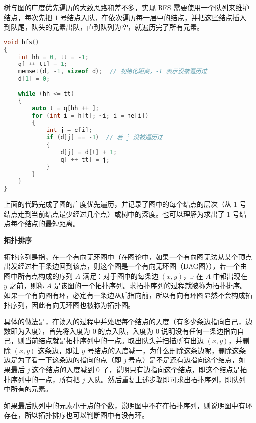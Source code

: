 

树与图的广度优先遍历的大致思路和差不多，实现 BFS 需要使用一个队列来维护结点，每次先把 $1$ 号结点入队，在依次遍历每一层中的结点，并把这些结点插入到队尾，队头的元素出队，直到队列为空，就遍历完了所有元素。

\begin{lstlisting}[language=cpp]
void bfs()
{
    int hh = 0, tt = -1;
    q[ ++ tt] = 1;
    memset(d, -1, sizeof d);  // 初始化距离，-1 表示没被遍历过
    d[1] = 0;
    
    while (hh <= tt)
    {
        auto t = q[hh ++ ];
        for (int i = h[t]; ~i; i = ne[i])
        {
            int j = e[i];
            if (d[j] == -1)  // 若 j 没被遍历过
            {
                d[j] = d[t] + 1;
                q[ ++ tt] = j;
            }
        }
    }
}
\end{lstlisting}

上面的代码完成了图的广度优先遍历，并记录了图中的每个结点的层次（从 $1$ 号结点走到当前结点最少经过几个点）或树中的深度。也可以理解为求出了 $1$ 号结点每个结点的最短距离。

\textbf{拓扑排序}

拓扑序列是指，在一个有向无环图中（在图论中，如果一个有向图无法从某个顶点出发经过若干条边回到该点，则这个图是一个有向无环图（DAG图）），若一个由图中所有点构成的序列 $A$ 满足：对于图中的每条边 $(x, y)$，$x$ 在 $A$ 中都出现在 $y$ 之前，则称 $A$ 是该图的一个拓扑序列。求拓扑序列的过程就被称为拓扑排序。如果一个有向图有环，必定有一条边从后指向前，所以有向有环图显然不会构成拓扑序列，因此有向无环图也被称为拓扑图。

具体的做法是，在读入的过程中并处理每个结点的入度（有多少条边指向自己，边数即为入度），首先将入度为 $0$ 的点入队，入度为 $0$ 说明没有任何一条边指向自己，则当前结点就是拓扑序列中的一点。取出队头并扫描所有出边 $(x, y)$，并删除 $(x, y)$ 这条边，即让 $y$ 号结点的入度减一，为什么删除这条边呢，删除这条边是为了看一下这条边的指向的点（即 $j$ 号点）是不是还有边指向这个结点，如果最后 $j$ 这个结点的入度减到 $0$ 了，说明只有边指向这个结点，即这个结点是拓扑序列中的一点，所有把 $j$ 入队。然后重复上述步骤即可求出拓扑序列，即队列中所有的元素。

如果最后队列中的元素小于点的个数，说明图中不存在拓扑序列，则说明图中有环存在，所以拓扑排序也可以判断图中有没有环。

